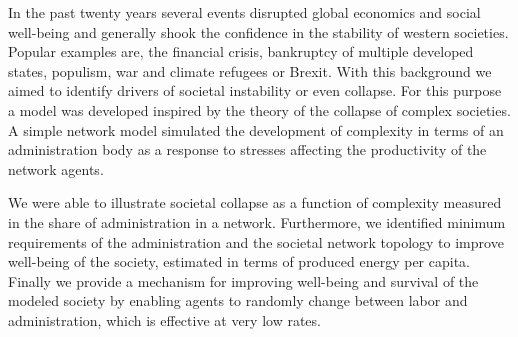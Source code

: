 In the past twenty years several events disrupted global economics and social well-being and generally shook the confidence in the stability of western societies. Popular examples are, the financial crisis, bankruptcy of multiple developed states, populism, war and climate refugees or Brexit. With this background we aimed to identify drivers of societal instability or even collapse. For this purpose a model was developed inspired by the theory of the collapse of complex societies. A simple network model simulated the development of complexity in terms of an administration body as a response to stresses affecting the productivity of the network agents.

We were able to illustrate societal collapse as a function of complexity measured in the share of administration in a network. Furthermore, we identified minimum requirements of the administration and the societal network topology to improve well-being of the society, estimated in terms of produced energy per capita. Finally we provide a mechanism for improving well-being and survival of the modeled society by enabling agents to randomly change between labor and administration, which is effective at very low rates.


